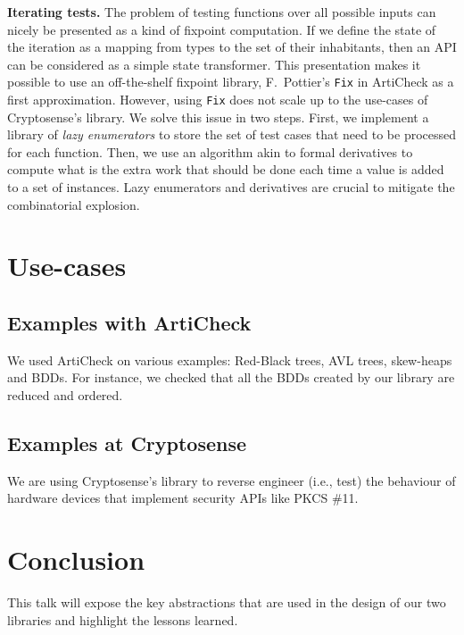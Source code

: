 \documentclass[twocolumn,9pt]{article}
\newcommand{\acheck}{ArtiCheck\xspace}
\newcommand{\code}[1]{\texttt{#1}}
\renewcommand\paragraph[1]{\newline\textbf{#1}}
\begin{document}
\paragraph{Iterating tests.} The problem of testing functions over all
possible inputs can nicely be presented as a kind of fixpoint
computation. If we define the state of the iteration as a mapping from
types to the set of their inhabitants, then an API can be considered
as a simple state transformer.
%
This presentation makes it possible to use an off-the-shelf fixpoint
library, F.~Pottier's \code{Fix} in \acheck as a first
approximation.
%
However, using \code{Fix} does not scale up to the use-cases of
Cryptosense's library. We solve this issue in two steps. First, we
implement a library of \emph{lazy enumerators} to store the set of
test cases that need to be processed for each function. Then, we use
an algorithm akin to formal derivatives to compute what is the extra
work that should be done each time a value is added to a set of
instances. Lazy enumerators and derivatives are crucial to mitigate
the combinatorial explosion.

\section{Use-cases}
\subsection{Examples with \acheck}
We used \acheck on various examples: Red-Black trees, AVL trees,
skew-heaps and BDDs. For instance, we checked that all the BDDs
created by our library are reduced and ordered.
\subsection{Examples at Cryptosense}
We are using Cryptosense's library to reverse engineer (i.e., test)
the behaviour of hardware devices that implement security APIs like
PKCS \#11.

\section{Conclusion}
This talk will expose the key abstractions that are used in the design
of our two libraries and highlight the lessons learned.


% 
% 
\end{document}
